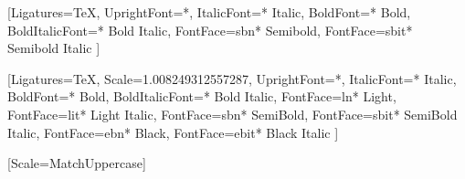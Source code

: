 \usepackage[margin=0.75in]{geometry}

\usepackage{fontspec}
\setmainfont{Arno Pro}
  [Ligatures=TeX,
   UprightFont=*,
   ItalicFont={* Italic},
   BoldFont={* Bold},
   BoldItalicFont={* Bold Italic},
   FontFace={sb}{n}{* Semibold},
   FontFace={sb}{it}{* Semibold Italic}
   ]
\DeclareRobustCommand{\sbseries}{\fontseries{sb}\selectfont}
\DeclareTextFontCommand{\textsb}{\sbseries}

\setsansfont{Source Sans Pro}
  [Ligatures=TeX,
   Scale=1.008249312557287,
   UprightFont=*,
   ItalicFont={* Italic},
   BoldFont={* Bold},
   BoldItalicFont={* Bold Italic},
   FontFace={l}{n}{* Light},
   FontFace={l}{it}{* Light Italic},
   FontFace={sb}{n}{* SemiBold},
   FontFace={sb}{it}{* SemiBold Italic},
   FontFace={eb}{n}{* Black},
   FontFace={eb}{it}{* Black Italic}
  ]
\DeclareRobustCommand{\ltseries}{\fontseries{l}\selectfont}
\DeclareTextFontCommand{\textlt}{\ltseries}
\DeclareRobustCommand{\ebseries}{\fontseries{eb}\selectfont}
\DeclareTextFontCommand{\texteb}{\ebseries}

\setmonofont{IBM Plex Mono Regular}[Scale=MatchUppercase]

\usepackage[dvipsnames]{xcolor}

\usepackage{titling}
\pretitle{\begin{center}\large\sffamily\bfseries\color{themecolour}}
\posttitle{\par\end{center}\vspace{-2ex}}
\preauthor{\begin{center}}
\postauthor{\end{center}\vspace{-5ex}}
\predate{\begin{center}}
\postdate{\end{center}}


